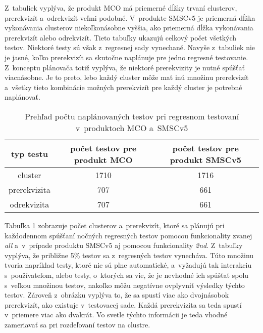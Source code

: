 Z~tabuliek vyplýva, že produkt MCO má priemerné dĺžky trvaní clusterov, 
prerekvizít a~odrekvizít veľmi podobné. V~produkte SMSCv5 je priemerná
dĺžka vykonávania clusterov niekoľkonásobne vyššia, ako priemerná dĺžka 
vykonávania prerekvizít alebo odrekvizít.
Tieto tabuľky ukazujú celkový počet všetkých testov. 
Niektoré testy sú však z~regresnej sady vynechané.
Navyše z~tabuliek nie je jasné, koľko prerekvizít sa skutočne naplánuje 
pre jedno regresné testovanie. Z~konceptu plánovača totiž vyplýva, že niektoré 
prerekvizity je nutné spúšťať viacnásobne.
Je to preto, lebo každý cluster môže mať inú množinu prerekvizít
a~všetky tieto kombinácie možných prerekvizít pre každý cluster
je potrebné naplánovať.

\begin{table}
  \begin{center}
    \begin{tabular}{| c | c | c |}
    \hline
    typ testu    & počet testov pre produkt MCO & 
    počet testov pre produkt SMSCv5 \\ \hline
    cluster      & 1710 & 1716 \\ \hline
    prerekvizita & 707  & 661  \\ \hline
    odrekvizita  & 707  & 661 \\
    \hline
    \end{tabular}
    \caption{Prehľad počtu naplánovaných testov pri regresnom testovaní 
             v~produktoch MCO a~SMSCv5}
    \label{tabulka:pocet_naplanovanych_testov}
  \end{center}
\end{table}

Tabuľka \ref{tabulka:pocet_naplanovanych_testov} zobrazuje počet 
clusterov a~prerekvizít, ktoré sa plánujú pri každodennom spúšťaní 
nočných regresných testov pomocou funkcionality zvanej \textit{all} a~v~prípade produktu 
SMSCv5 aj pomocou funkcionality \textit{2nd}. Z~tabuľky vyplýva, že 
približne 5\% testov sa z~regresných testov vynecháva. 
Túto množinu tvoria napríklad testy, ktoré nie sú plne automatické, 
a~vyžadujú tak interakciu s~používateľom, alebo testy, o~ktorých sa vie, 
že je nevhodné ich spúšťať spolu s~veľkou množinou testov, 
nakoľko môžu negatívne ovplyvniť výsledky týchto testov.
Zároveň z~obrázku vyplýva to, že sa spustí viac ako dvojnásobok 
prerekvizít, ako existuje v~testovacej sade. Každá prerekvizita sa teda 
spustí v~priemere viac ako dvakrát. Vo svetle týchto informácii je teda 
vhodné zameriavať sa pri rozdeľovaní testov na clustre.


